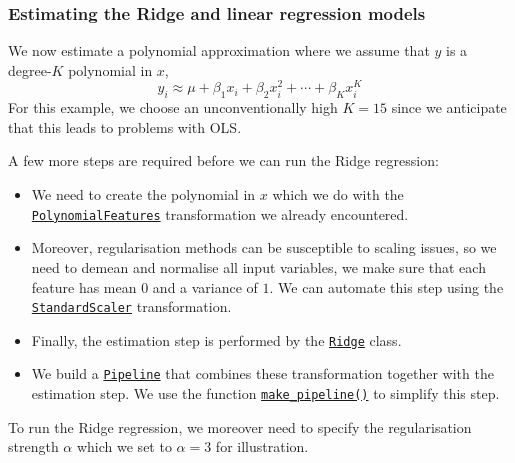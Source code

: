 \documentclass{scrartcl}
\providecommand{\tightlist}{%
      \setlength{\itemsep}{0pt}\setlength{\parskip}{0pt}}
\begin{document}
    \hypertarget{estimating-the-ridge-and-linear-regression-models}{%
\subsubsection*{Estimating the Ridge and linear regression
models}\label{estimating-the-ridge-and-linear-regression-models}}

We now estimate a polynomial approximation where we assume that \(y\) is
a degree-\(K\) polynomial in \(x\), \ie \[
y_i \approx \mu + \beta_1 x_i + \beta_2 x_i^2 + \cdots + \beta_K x_i^K 
\] For this example, we choose an unconventionally high \(K=15\) since
we anticipate that this leads to problems with OLS.

A few more steps are required before we can run the Ridge regression:

\begin{itemize}
\tightlist
\item
  We need to create the polynomial in \(x\) which we do with the
  \href{https://scikit-learn.org/stable/modules/generated/sklearn.preprocessing.PolynomialFeatures.html}{\texttt{PolynomialFeatures}}
  transformation we already encountered.
\item
  Moreover, regularisation methods can be susceptible to scaling issues,
  so we need to demean and normalise all input variables, \ie we make
  sure that each feature has mean \(0\) and a variance of \(1\). We can
  automate this step using the
  \href{https://scikit-learn.org/stable/modules/generated/sklearn.preprocessing.StandardScaler.html}{\texttt{StandardScaler}}
  transformation.
\item
  Finally, the estimation step is performed by the
  \href{https://scikit-learn.org/stable/modules/generated/sklearn.linear_model.Ridge.html}{\texttt{Ridge}}
  class.
\item
  We build a
  \href{https://scikit-learn.org/stable/modules/generated/sklearn.pipeline.Pipeline.html}{\texttt{Pipeline}}
  that combines these transformation together with the estimation step.
  We use the function
  \href{https://scikit-learn.org/stable/modules/generated/sklearn.pipeline.make_pipeline.html}{\texttt{make\_pipeline()}}
  to simplify this step.
\end{itemize}

To run the Ridge regression, we moreover need to specify the
regularisation strength \(\alpha\) which we set to \(\alpha = 3\) for
illustration.
\end{document}
